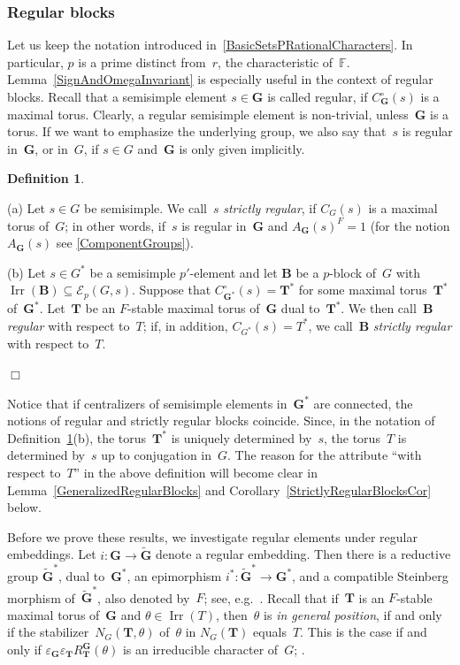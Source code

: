\documentclass[12pt]{amsart}
\newcommand{\bG}{{\mathbf{G}}}      %
\newcommand{\bB}{{\mathbf{B}}}
\newcommand{\bT}{{\mathbf{T}}}
\DeclareMathOperator{\Irr}{Irr}
\theoremstyle{theorem}
\theoremstyle{definition}
\newtheorem{defn}[thm]{Definition}
\theoremstyle{remark}
\begin{document}
\addtocounter{subsubsection}{1}
\subsubsection{Regular blocks} 
\label{RegularBlocksSection}
Let us keep the notation introduced in~\ref{BasicSetsPRationalCharacters}. In 
particular, $p$ is a prime distinct from~$r$, the characteristic 
of~$\mathbb{F}$. Lemma~\ref{SignAndOmegaInvariant} is especially useful in the 
context of {regular blocks}. Recall that a semisimple element $s \in \bG$ is 
called regular, if $C^{\circ}_{\bG}( s )$ is a maximal torus. Clearly, a regular
semisimple element is non-trivial, unless~$\bG$ is a torus. If we want to 
emphasize the underlying group, we also say that~$s$ is regular in~$\bG$, or 
in~$G$, if $s \in G$ and~$\bG$ is only given implicitly.

\addtocounter{thm}{1}
\begin{defn}
\label{RegularBlocksDefinition}
{\rm
(a) Let $s \in G$ be semisimple. We call~$s$ \textit{strictly regular}, if
$C_G( s )$ is a maximal torus of~$G$; in other words, if~$s$ is regular 
in~$\bG$ and $A_{\bG}(s)^F = 1$ (for the notion $A_{\bG}(s)$ see
\ref{ComponentGroups}).

(b) Let $s \in G^*$ be a semisimple $p'$-element and let $\bB$ be a $p$-block 
of~$G$ with $\Irr( \bB ) \subseteq \mathcal{E}_p( G, s )$. Suppose that 
$C^{\circ}_{\bG^*}( s ) = \bT^*$ for some maximal torus~$\bT^*$ of~$\bG^*$. 
Let~$\bT$ be an $F$-stable maximal torus of~$\bG$ dual to~$\bT^*$.
We then call~$\bB$ \textit{regular} with respect to~$T$; if, in addition,
$C_{G^*}( s ) = T^*$, we call~$\bB$ \textit{strictly regular}
with respect to~$T$.
}\hfill{$\Box$}
\end{defn}
Notice that if centralizers of semisimple elements in~$\bG^*$ are connected,
the notions of regular and strictly regular blocks coincide. Since, in the 
notation of Definition~\ref{RegularBlocksDefinition}(b), the torus~$\bT^*$ is 
uniquely determined by~$s$, the torus~$T$ is determined by~$s$ up to conjugation 
in~$G$. The reason for the attribute ``with respect to~$T$'' in the above 
definition will become clear in Lemma~\ref{GeneralizedRegularBlocks} and 
Corollary~\ref{StrictlyRegularBlocksCor} below.

Before we prove these results, we investigate regular elements under regular 
embeddings. 
Let $i : \bG \rightarrow \tilde{\bG}$ denote a regular embedding. Then there
is a reductive group $\tilde{\bG}^*$, dual to~$\bG^*$, an epimorphism
$i^* : \tilde{\bG}^* \rightarrow \bG^*$, and a compatible Steinberg morphism 
of~$\tilde{\bG}^*$, also denoted by~$F$; see, e.g.\ \cite[2.B, 2.D]{CeBo2}.
Recall that if~$\bT$ is an $F$-stable maximal torus of~$\bG$ and $\theta \in
\Irr(T)$, then~$\theta$ is\textit{ in general position}, if and only if the 
stabilizer~$N_G( \bT, \theta )$ of~$\theta$ in $N_G( \bT )$ equals~$T$. This is 
the case if and only if 
$\varepsilon_{\bG}\varepsilon_{\bT}R_{\bT}^{\bG}( \theta )$ is an irreducible 
character of~$G$; \cite[Corollary~$2.2.9$(a)]{GeMa}.
\end{document}
